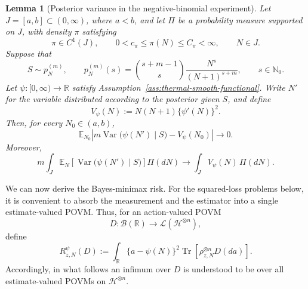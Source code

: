 \documentclass{article}
\newtheorem{lemma}[theorem]{Lemma}
\theoremstyle{named}
\theoremstyle{named1}
\newcommand{\Tr}{\operatorname{Tr}}
\newcommand{\bbR}{\mathbb R}
\newcommand{\cH}{\mathcal H}
\theoremstyle{plain}
\theoremstyle{remark}
\begin{document}
\begin{lemma}[Posterior variance in the negative-binomial experiment]
\label{lem:nb-posterior-variance}
Let \(J=[a,b]\subset(0,\infty)\), where \(a<b\), and let
\(\Pi\) be a probability measure supported on \(J\), with density
\(\pi\) satisfying
\[
    \pi\in C^1(J),
    \qquad
    0<c_\pi\leq \pi(N)\leq C_\pi<\infty,
    \qquad N\in J.
\]
Suppose that
\[
    S\sim p_N^{(m)},
    \qquad
    p_N^{(m)}(s)
    =
    \binom{s+m-1}{s}
    \frac{N^s}{(N+1)^{s+m}},
    \qquad s\in\mathbb N_0.
\]
Let \(\psi:[0,\infty)\to\mathbb R\) satisfy Assumption~\ref{ass:thermal-smooth-functional}.
Write \(N'\) for the variable distributed according to the posterior
given \(S\), and define
\[
    V_\psi(N)
    :=
    N(N+1)\{\psi'(N)\}^2.
\]
Then, for every \(N_0\in(a,b)\),
\begin{equation}
    \mathbb E_{N_0}
    \left|
        m\operatorname{Var}\bigl(\psi(N')\mid S\bigr)
        -
        V_\psi(N_0)
    \right|
    \rightarrow 0.
    \label{eq:nb-pointwise-posterior-functional-variance}
\end{equation}
Moreover,
\begin{equation}
    m\int_J
    \mathbb E_N
    \left[
        \operatorname{Var}\bigl(\psi(N')\mid S\bigr)
    \right]
    \Pi(dN)
    \rightarrow
    \int_J V_\psi(N)\,\Pi(dN).
    \label{eq:nb-integrated-posterior-functional-variance}
\end{equation}
\end{lemma}






We can now derive the Bayes-minimax risk.
For the squared-loss problems below, it is convenient to absorb the
measurement and the estimator into a single estimate-valued POVM.
Thus, for an action-valued POVM
\[
    D:\mathcal B(\bbR)\rightarrow
    \mathcal L(\cH^{\otimes n}),
\]
define
\begin{equation}
    R_{z,N}^{\psi}(D)
    :=
    \int_{\bbR}
        \{a-\psi(N)\}^2
        \Tr\!\left[
            \rho_{z,N}^{\otimes n}D(da)
        \right].
    \label{eq:thermal-functional-risk}
\end{equation}
Accordingly, in what follows an infimum over \(D\) is understood to be
over all estimate-valued POVMs on \(\cH^{\otimes n}\).
\end{document}
